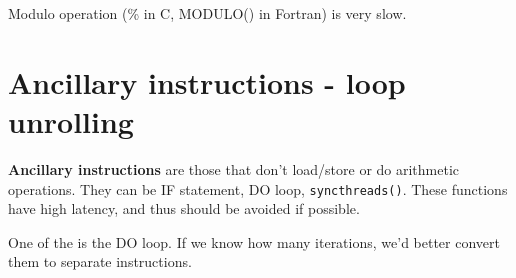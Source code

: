 Modulo operation (\% in C, MODULO() in Fortran) is very slow. 


\section{Ancillary instructions - loop unrolling}
\label{sec:ancill-instr-loop}


{\bf Ancillary instructions} are those that don't load/store or do
arithmetic operations. They can be IF statement, DO loop,
\verb!syncthreads()!. These functions have high latency, and thus
should be avoided if possible. 


One of the is the DO loop. If we know how many iterations, we'd better
convert them to separate instructions. 


